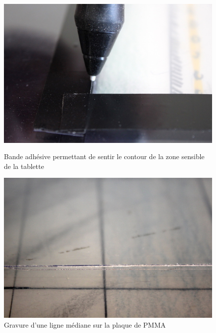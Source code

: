 \begin{figure}[!htbp]
	\captionsetup{format=plain}%
	\centering
	\begin{minipage}[t]{0.48\textwidth}
		\includegraphics[width=\linewidth]{gfx/05_interfaces/filigramophone-adhesif_72dpi.jpg}
		\caption{Bande adhésive permettant de sentir le contour de la zone sensible de la tablette}
		\label{fig:interface:filigramophone-adhesif}
	\end{minipage}
	\hspace{.02\linewidth}
	\begin{minipage}[t]{0.48\textwidth}
	    \includegraphics[width=\linewidth]{gfx/05_interfaces/Filigramophone_gravure_72dpi.jpg}
		\caption{Gravure d'une ligne médiane sur la plaque de \gls{PMMA}}
		\label{fig:interface:filigramophone-plexigravure}
	\end{minipage}
\end{figure}

